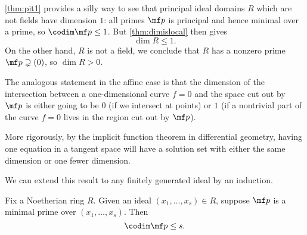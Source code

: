 \begin{remark}[Nir]
	\autoref{thm:pit1} provides a silly way to see that principal ideal domains $R$ which are not fields have dimension $1$: all primes $\mf p$ is principal and hence minimal over a prime, so $\codim\mf p\le1$. But \autoref{thm:dimislocal} then gives
	\[\dim R\le1.\]
	On the other hand, $R$ is not a field, we conclude that $R$ has a nonzero prime $\mf p\supsetneq(0)$, so $\dim R>0$.
\end{remark}
\begin{remark} \label{rem:geometricpit}
	The analogous statement in the affine case is that the dimension of the intersection between a one-dimensional curve $f=0$ and the space cut out by $\mf p$ is either going to be $0$ (if we intersect at points) or $1$ (if a nontrivial part of the curve $f=0$ lives in the region cut out by $\mf p$).
	
	More rigorously, by the implicit function theorem in differential geometry, having one equation in a tangent space will have a solution set with either the same dimension or one fewer dimension.
\end{remark}
We can extend this result to any finitely generated ideal by an induction.
\begin{theorem} \label{thm:pit}
	Fix a Noetherian ring $R$. Given an ideal $(x_1,\ldots,x_s)\in R$, suppose $\mf p$ is a minimal prime over $(x_1,\ldots,x_s)$. Then
	\[\codim\mf p\le s.\]
\end{theorem}
